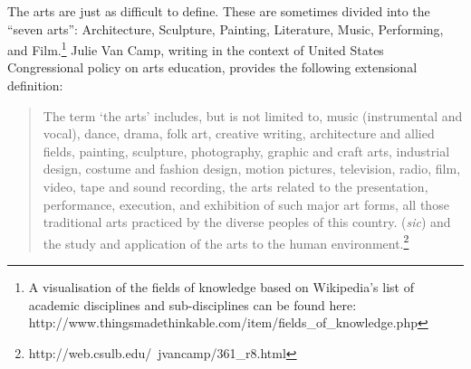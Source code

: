 \documentclass[letterpaper]{article}
\begin{document}

The arts are just as difficult to define.  These are sometimes divided
into the ``seven arts'': Architecture, Sculpture, Painting,
Literature, Music, Performing, and Film.\footnote{A visualisation of
  the fields of knowledge based on Wikipedia's list of academic
  disciplines and sub-disciplines can be found here:
  http://www.thingsmadethinkable.com/item/fields\_of\_knowledge.php}
Julie Van Camp, writing in the context of United States Congressional 
policy on arts education, provides the following extensional
definition:

\begin{quote}
  The term `the arts' includes, but is not limited to, music
  (instrumental and vocal), dance, drama, folk art, creative writing,
  architecture and allied fields, painting, sculpture, photography,
  graphic and craft arts, industrial design, costume and fashion
  design, motion pictures, television, radio, film, video, tape and
  sound recording, the arts related to the presentation, performance,
  execution, and exhibition of such major art forms, all those
  traditional arts practiced by the diverse peoples of this
  country. ({\em sic}) and the study and application of the arts to
  the human
  environment.\footnote{http://web.csulb.edu/~jvancamp/361\_r8.html}
\end{quote}



\end{document}
